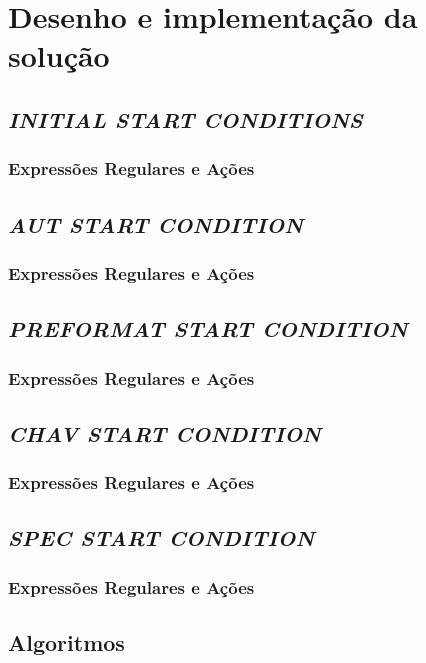 \section{Desenho e implementação da solução}
\label{sec:des:b1}

\subsection{\emph{INITIAL \emph{START CONDITIONS}}}
\subsubsection{Expressões Regulares e Ações}
\subsection{\emph{AUT \emph{START CONDITION}}}
\subsubsection{Expressões Regulares e Ações}
\subsection{\emph{PREFORMAT \emph{START CONDITION}}}
\subsubsection{Expressões Regulares e Ações}
\subsection{\emph{CHAV \emph{START CONDITION}}}
\subsubsection{Expressões Regulares e Ações}
\subsection{\emph{SPEC \emph{START CONDITION}}}
\subsubsection{Expressões Regulares e Ações}

\subsection{Algoritmos}

